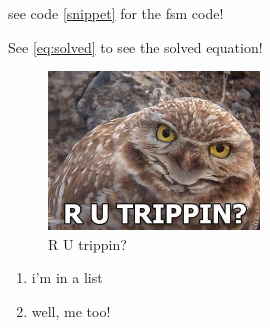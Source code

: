 \documentclass[11pt,a4paper]{report}
\begin{document}
		see code \ref{snippet} for the fsm code!

		See \ref{eq:solved} to see the solved equation!

		\begin{figure}[\htbp]
			\includegraphics[width=0.5\textwidth]{rutrippin}
		  \caption{R U trippin?}
		  \label{trippin}
		\end{figure}


		\begin{enumerate}
		\item i'm in a list
		\item well, me too!
		\end{enumerate}

		
\end{document}

